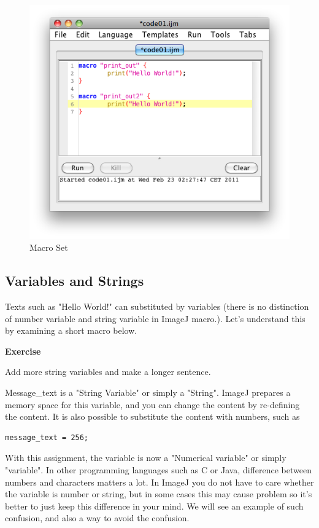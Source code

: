 \documentclass[11pt,a4paper,oneside]{report}
\newenvironment{indentexercise}[1]%
{{\setlength{\leftmargin}{2em}}%
\textbf{Exercise \thesubsection-#1}%
\begin{list}{}%
	\item%
}
{\end{list}}
\begin{document}
\begin{figure}[htbp]
\begin{center}
\includegraphics[scale=0.6]{fig/editor_MacroSet.png}
\caption{Macro Set} \label{fig_MacroSetInMenu}
\end{center}
\end{figure}

\subsection{Variables and Strings}
Texts such as "Hello World!" can substituted by variables (there is no distinction of number variable and string variable in ImageJ macro.). Let's understand this by examining a short macro below.




\begin{indentexercise}{1}
\item Add more string variables and make a longer sentence.\\
\end{indentexercise}

Message\_text is a "String Variable" or simply a "String". ImageJ prepares a memory space for this variable, and you can change the content by re-defining the content. It is also possible to substitute the content with numbers, such as\\
\begin{lstlisting}[numbers=none]
message_text = 256;
\end{lstlisting}
With this assignment, the variable is now a "Numerical variable" or simply "variable". In other programming languages such as C or Java, difference between numbers and characters matters a lot. In ImageJ you do not have to care whether the variable is number or string, but in some cases this may cause problem so it's better to just keep this difference in your mind. We will see an example of such confusion, and also a way to avoid the confusion. 
\end{document}
